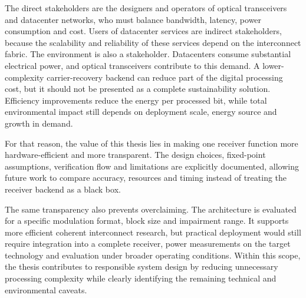 The direct stakeholders are the designers and operators of optical transceivers and datacenter networks, who must balance bandwidth, latency, power consumption and cost. Users of datacenter services are indirect stakeholders, because the scalability and reliability of these services depend on the interconnect fabric. The environment is also a stakeholder. Datacenters consume substantial electrical power, and optical transceivers contribute to this demand. A lower-complexity carrier-recovery backend can reduce part of the digital processing cost, but it should not be presented as a complete sustainability solution. Efficiency improvements reduce the energy per processed bit, while total environmental impact still depends on deployment scale, energy source and growth in demand.

For that reason, the value of this thesis lies in making one receiver function more hardware-efficient and more transparent. The design choices, fixed-point assumptions, verification flow and limitations are explicitly documented, allowing future work to compare accuracy, resources and timing instead of treating the receiver backend as a black box.

The same transparency also prevents overclaiming. The architecture is evaluated for a specific modulation format, block size and impairment range. It supports more efficient coherent interconnect research, but practical deployment would still require integration into a complete receiver, power measurements on the target technology and evaluation under broader operating conditions. Within this scope, the thesis contributes to responsible system design by reducing unnecessary processing complexity while clearly identifying the remaining technical and environmental caveats.
